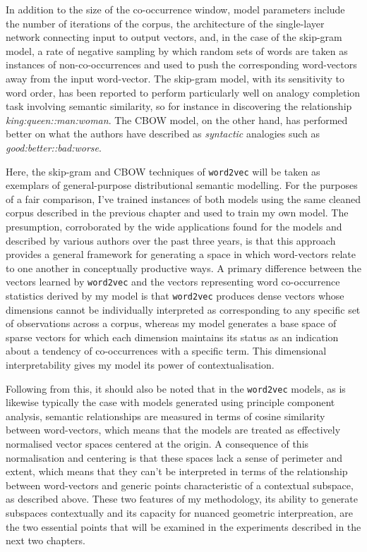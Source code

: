In addition to the size of the co-occurrence window, model parameters include the number of iterations of the corpus, the architecture of the single-layer network connecting input to output vectors, and, in the case of the skip-gram model, a rate of negative sampling by which random sets of words are taken as instances of non-co-occurrences and used to push the corresponding word-vectors away from the input word-vector.  The skip-gram model, with its sensitivity to word order, has been reported to perform particularly well on analogy completion task involving semantic similarity, so for instance in discovering the relationship \emph{king:queen::man:woman}.  The CBOW model, on the other hand, has performed better on what the authors have described as \emph{syntactic} analogies such as \emph{good:better::bad:worse}.

Here, the skip-gram and CBOW techniques of \texttt{word2vec} will be taken as exemplars of general-purpose distributional semantic modelling.  For the purposes of a fair comparison, I've trained instances of both models using the same cleaned corpus described in the previous chapter and used to train my own model.  The presumption, corroborated by the wide applications found for the models and described by various authors over the past three years, is that this approach provides a general framework for generating a space in which word-vectors relate to one another in conceptually productive ways.  A primary difference between the vectors learned by \texttt{word2vec} and the vectors representing word co-occurrence statistics derived by my model is that \texttt{word2vec} produces dense vectors whose dimensions cannot be individually interpreted as corresponding to any specific set of observations across a corpus, whereas my model generates a base space of sparse vectors for which each dimension maintains its status as an indication about a tendency of co-occurrences with a specific term.  This dimensional interpretability gives my model its power of contextualisation.

Following from this, it should also be noted that in the \texttt{word2vec} models, as is likewise typically the case with models generated using principle component analysis, semantic relationships are measured in terms of cosine similarity between word-vectors, which means that the models are treated as effectively normalised vector spaces centered at the origin.  A consequence of this normalisation and centering is that these spaces lack a sense of perimeter and extent, which means that they can't be interpreted in terms of the relationship between word-vectors and generic points characteristic of a contextual subspace, as described above.  These two features of my methodology, its ability to generate subspaces contextually and its capacity for nuanced geometric interpreation, are the two essential points that will be examined in the experiments described in the next two chapters.

